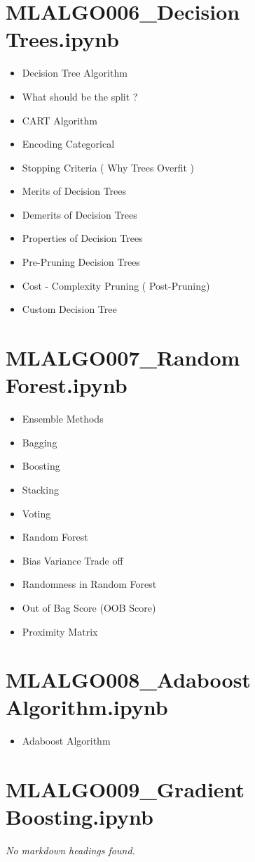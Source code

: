\documentclass[11pt]{article}
\begin{document}
\section*{MLALGO006\_Decision Trees.ipynb}
\begin{itemize}
\item Decision Tree Algorithm
\item What should be the split ?
\item CART Algorithm
\item Encoding Categorical
\item Stopping Criteria ( Why Trees Overfit )
\item Merits of Decision Trees
\item Demerits of Decision Trees
\item Properties of Decision Trees
\item Pre-Pruning Decision Trees
\item Cost - Complexity Pruning ( Post-Pruning)
\item Custom Decision Tree
\end{itemize}
\section*{MLALGO007\_Random Forest.ipynb}
\begin{itemize}
\item Ensemble Methods
\item Bagging
\item Boosting
\item Stacking
\item Voting
\item Random Forest
\item Bias Variance Trade off
\item Randomness in Random Forest
\item Out of Bag Score (OOB Score)
\item Proximity Matrix
\end{itemize}
\section*{MLALGO008\_Adaboost Algorithm.ipynb}
\begin{itemize}
\item Adaboost Algorithm
\end{itemize}
\section*{MLALGO009\_Gradient Boosting.ipynb}
\textit{No markdown headings found.}
\end{document}
